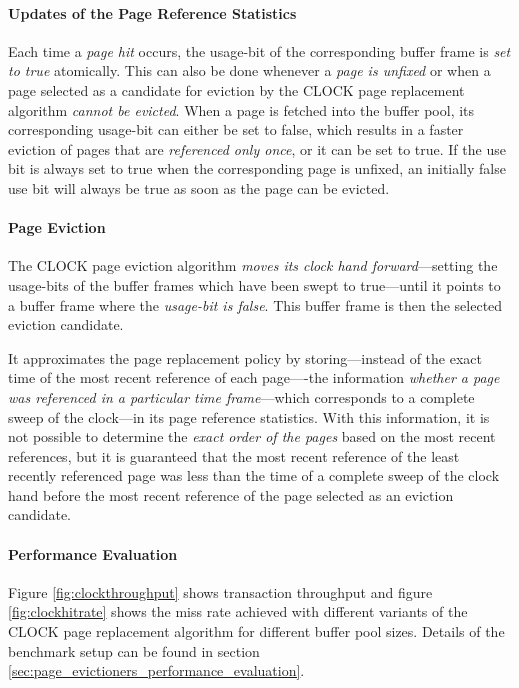 \paragraph{Updates of the Page Reference Statistics}

    Each time a \emph{page hit} occurs, the usage-bit of the corresponding buffer frame is \emph{set to true} atomically. This can also be done whenever a \emph{page is unfixed} or when a page selected as a candidate for eviction by the CLOCK page replacement algorithm \emph{cannot be evicted}. When a page is fetched into the buffer pool, its corresponding usage-bit can either be set to false, which results in a faster eviction of pages that are \emph{referenced only once}, or it can be set to true. If the use bit is always set to true when the corresponding page is unfixed, an initially false use bit will always be true as soon as the page can be evicted.

\paragraph{Page Eviction}

    The CLOCK page eviction algorithm \emph{moves its clock hand forward}---setting the usage-bits of the buffer frames which have been swept to true---until it points to a buffer frame where the \emph{usage-bit is false}. This buffer frame is then the selected eviction candidate.

    It approximates the  page replacement policy by storing---instead of the exact time of the most recent reference of each page----the information \emph{whether a page was referenced in a particular time frame}---which corresponds to a complete sweep of the clock---in its page reference statistics. With this information, it is not possible to determine the \emph{exact order of the pages} based on the most recent references, but it is guaranteed that the most recent reference of the least recently referenced page was less than the time of a complete sweep of the clock hand before the most recent reference of the page selected as an eviction candidate.

\paragraph{Performance Evaluation}

    Figure \ref{fig:clockthroughput} shows transaction throughput and figure \ref{fig:clockhitrate} shows the miss rate achieved with different variants of the CLOCK page replacement algorithm for different buffer pool sizes. Details of the benchmark setup can be found in section \ref{sec:page_evictioners_performance_evaluation}.

